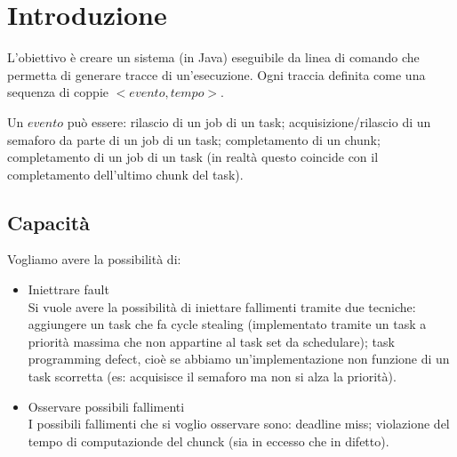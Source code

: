 \chapter{Introduzione}
L'obiettivo è creare un sistema (in Java) eseguibile da linea di comando che permetta di generare tracce di un'esecuzione. Ogni traccia definita come una sequenza di coppie $<evento,tempo>$.

Un $evento$ può essere: rilascio di un job di un task; acquisizione/rilascio di un semaforo da parte di un job di un task; completamento di un chunk; completamento di un job di un task (in realtà questo coincide con il completamento dell'ultimo chunk del task).

\section{Capacità}
Vogliamo avere la possibilità di:
\begin{itemize}
    \item Iniettrare fault \\
        Si vuole avere la possibilità di iniettare fallimenti tramite due tecniche: aggiungere un task che fa cycle stealing (implementato tramite un task a priorità massima che non appartine al task set da schedulare); task programming defect, cioè se abbiamo un'implementazione non funzione di un task scorretta (es: acquisisce il semaforo ma non si alza la priorità).
    \item Osservare possibili fallimenti \\
        I possibili fallimenti che si voglio osservare sono: deadline miss; violazione del tempo di computazionde del chunck (sia in eccesso che in difetto).
\end{itemize}